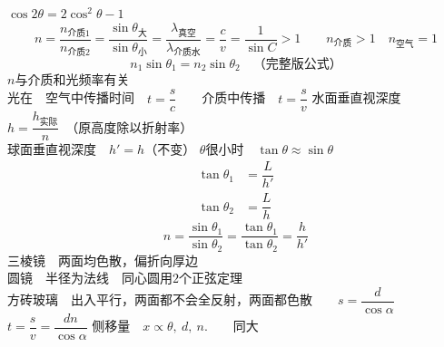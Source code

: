 $\cos2\theta=2\cos^2\theta-1$
\[
n=\dfrac{n_{\text{介质1}}}{n_{\text{介质2}}}=\dfrac{\sin\theta_{\text{大}}}{\sin\theta_{\text{小}}}=\dfrac{\lambda_{\text{真空}}}{\lambda_{\text{介质水}}}=\dfrac{c}{v}=\dfrac{1}{\sin C}>1
\qquad n_{\text{介质}}>1\quad n_{\text{空气}}=1
\]
\[
n_1\sin\theta_1=n_2\sin\theta_2\quad\text{（完整版公式）}
\]
$n$与介质和光频率有关\\[1ex]
光在　空气中传播时间　$t=\dfrac{s}{c}$　　介质中传播　$t=\dfrac{s}{v}$
水面垂直视深度　$h=\dfrac{h_{\text{实际}}}{n}$　（原高度除以折射率）\\[0.8ex]
球面垂直视深度　$h'=h$（不变）
$\theta$很小时　$\tan\theta\approx\sin\theta$
\begin{align*}
\tan\theta_1&=\dfrac{L}{h'}\\
\tan\theta_2&=\dfrac{L}{h}
\end{align*}
\[
n=\dfrac{\sin\theta_1}{\sin\theta_2}=\dfrac{\tan\theta_1}{\tan\theta_2}=\dfrac{h}{h'}
\]
三棱镜　两面均色散，偏折向厚边\\
圆镜　半径为法线　同心圆用$2$个正弦定理\\
方砖玻璃　出入平行，两面都不会全反射，两面都色散　　$s=\dfrac{d}{\cos\alpha}$　　$t=\dfrac{s}{v}=\dfrac{dn}{\cos\alpha}$ %
侧移量　$x\propto\theta,\ d,\ n.$　　同大
